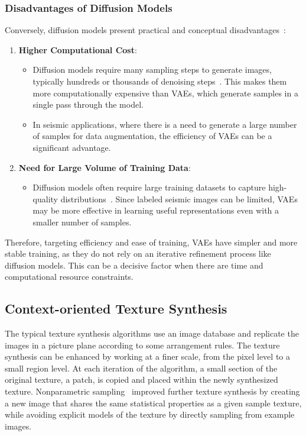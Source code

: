 \documentclass{ieeeaccess}
\begin{document}
\subsubsection{Disadvantages of Diffusion Models}
Conversely, diffusion models present practical and conceptual disadvantages~\cite{Zhou2024}:
\begin{enumerate}
    \item \textbf{Higher Computational Cost}:
    \begin{itemize}
        \item Diffusion models require many sampling steps to generate images, typically hundreds or thousands of denoising steps~\cite{Zhou2024}. This makes them more computationally expensive than VAEs, which generate samples in a single pass through the model.
        \item In seismic applications, where there is a need to generate a large number of samples for data augmentation, the efficiency of VAEs can be a significant advantage. 
    \end{itemize}
    \item \textbf{Need for Large Volume of Training Data}:
    \begin{itemize}
        \item Diffusion models often require large training datasets to capture high-quality distributions~\cite{Zhou2024}. Since labeled seismic images can be limited, VAEs may be more effective in learning useful representations even with a smaller number of samples.
    \end{itemize}
\end{enumerate}

Therefore, targeting efficiency and ease of training, VAEs have simpler and more stable training, as they do not rely on an iterative refinement process like diffusion models. This can be a decisive factor when there are time and computational resource constraints.

\subsection{Context-oriented Texture Synthesis}

The typical texture synthesis algorithms use an image database and replicate the images in a picture plane according to some arrangement rules. The texture synthesis can be enhanced by working at a finer scale, from the pixel level to a small region level. At each iteration of the algorithm, a small section of the original texture, a patch, is copied and placed within the newly synthesized texture. Nonparametric sampling~\cite{Efros1999} improved further texture synthesis by creating a new image that shares the same statistical properties as a given sample texture, while avoiding explicit models of the texture by directly sampling from example images.
\end{document}
